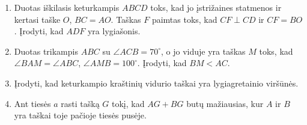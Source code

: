 \begin{enumerate}
\item Duotas iškilasis keturkampis $ABCD$ toks, kad  jo įstrižaines
  statmenos ir kertasi taške $O$, $BC = AO$.  Taškas $F$ paimtas toks, kad
  $CF \perp{CD}$ ir $CF = BO$.  Įrodyti, kad $ADF$ yra lygiašonis. 
\item Duotas trikampis $ABC$ su $\angle ACB = 70^\circ$, o jo viduje yra
  taškas $M$ toks, kad $\angle BAM = \angle ABC$, $\angle AMB = 100^\circ$.
  Įrodyti, kad $BM<AC$.
\item Įrodyti, kad keturkampio kraštinių vidurio taškai yra lygiagretainio
  viršūnės.
\item Ant tiesės $a$ rasti tašką $G$ tokį, kad $AG+BG$ butų mažiausias, kur
  $A$ ir $B$ yra taškai toje pačioje tiesės pusėje.

\end{enumerate}
